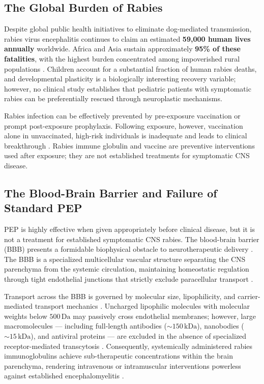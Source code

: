 \documentclass[12pt,a4paper]{article}
\begin{document}
\subsection{The Global Burden of Rabies}

Despite global public health initiatives to eliminate dog-mediated transmission, rabies virus encephalitis continues to claim an estimated \textbf{59,000 human lives annually} worldwide. Africa and Asia sustain approximately \textbf{95\% of these fatalities}, with the highest burden concentrated among impoverished rural populations \citep{liu2025syn023}. Children account for a substantial fraction of human rabies deaths, and developmental plasticity is a biologically interesting recovery variable; however, no clinical study establishes that pediatric patients with symptomatic rabies can be preferentially rescued through neuroplastic mechanisms.

Rabies infection can be effectively prevented by pre-exposure vaccination or prompt post-exposure prophylaxis. Following exposure, however, vaccination alone in unvaccinated, high-risk individuals is inadequate and leads to clinical breakthrough \citep{liu2025syn023}. Rabies immune globulin and vaccine are preventive interventions used after exposure; they are not established treatments for symptomatic CNS disease.

\subsection{The Blood-Brain Barrier and Failure of Standard PEP}

PEP is highly effective when given appropriately before clinical disease, but it is not a treatment for established symptomatic CNS rabies. The blood-brain barrier (BBB) presents a formidable biophysical obstacle to neurotherapeutic delivery \citep{parvar2025ced}. The BBB is a specialized multicellular vascular structure separating the CNS parenchyma from the systemic circulation, maintaining homeostatic regulation through tight endothelial junctions that strictly exclude paracellular transport \citep{parvar2025ced}.

Transport across the BBB is governed by molecular size, lipophilicity, and carrier-mediated transport mechanics \citep{parvar2025ced}. Uncharged lipophilic molecules with molecular weights below $500\,\mathrm{Da}$ may passively cross endothelial membranes; however, large macromolecules --- including full-length antibodies ($\sim 150\,\mathrm{kDa}$), nanobodies ($\sim 15\,\mathrm{kDa}$), and antiviral proteins --- are excluded in the absence of specialized receptor-mediated transcytosis \citep{parvar2025ced}. Consequently, systemically administered rabies immunoglobulins achieve sub-therapeutic concentrations within the brain parenchyma, rendering intravenous or intramuscular interventions powerless against established encephalomyelitis \citep{jackson2011therapy, lacy2024rabies}.
\end{document}
